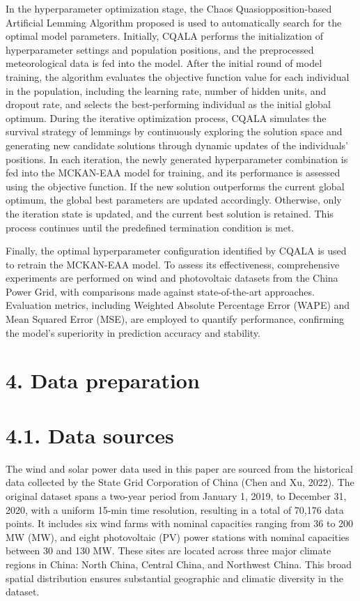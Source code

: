 \documentclass[
  10
]{article}
\begin{document}
In the hyperparameter optimization stage, the Chaos
Quasiopposition-based Artificial Lemming Algorithm proposed is used to
automatically search for the optimal model parameters. Initially, CQALA
performs the initialization of hyperparameter settings and population
positions, and the preprocessed meteorological data is fed into the
model. After the initial round of model training, the algorithm
evaluates the objective function value for each individual in the
population, including the learning rate, number of hidden units, and
dropout rate, and selects the best-performing individual as the initial
global optimum. During the iterative optimization process, CQALA
simulates the survival strategy of lemmings by continuously exploring
the solution space and generating new candidate solutions through
dynamic updates of the individuals' positions. In each iteration, the
newly generated hyperparameter combination is fed into the MCKAN-EAA
model for training, and its performance is assessed using the objective
function. If the new solution outperforms the current global optimum,
the global best parameters are updated accordingly. Otherwise, only the
iteration state is updated, and the current best solution is retained.
This process continues until the predefined termination condition is
met.

Finally, the optimal hyperparameter configuration identified by CQALA is
used to retrain the MCKAN-EAA model. To assess its effectiveness,
comprehensive experiments are performed on wind and photovoltaic
datasets from the China Power Grid, with comparisons made against
state-of-the-art approaches. Evaluation metrics, including Weighted
Absolute Percentage Error (WAPE) and Mean Squared Error (MSE), are
employed to quantify performance, confirming the model's superiority in
prediction accuracy and stability.

\section{4. Data preparation}\label{data-preparation}

\section{4.1. Data sources}\label{data-sources}

The wind and solar power data used in this paper are sourced from the
historical data collected by the State Grid Corporation of China (Chen
and Xu, 2022). The original dataset spans a two-year period from January
1, 2019, to December 31, 2020, with a uniform 15-min time resolution,
resulting in a total of 70,176 data points. It includes six wind farms
with nominal capacities ranging from 36 to 200 MW (MW), and eight
photovoltaic (PV) power stations with nominal capacities between 30 and
130 MW. These sites are located across three major climate regions in
China: North China, Central China, and Northwest China. This broad
spatial distribution ensures substantial geographic and climatic
diversity in the dataset.
\end{document}
